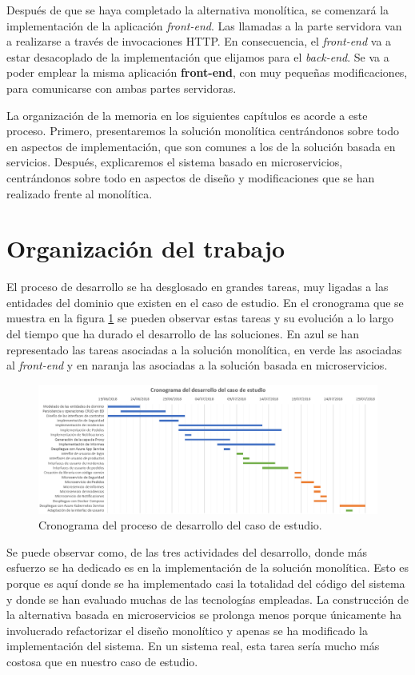 \documentclass[11pt,spanish,listoffigures]{tfgetsinf}
\begin{document}
Después de que se haya completado la alternativa monolítica, se comenzará la implementación de la aplicación \textit{front-end}. Las llamadas a la parte servidora van a realizarse a través de invocaciones HTTP. En consecuencia, el \textit{front-end} va a estar desacoplado de la implementación que elijamos para el \textit{back-end}. Se va a poder emplear la misma aplicación \textbf{front-end}, con muy pequeñas modificaciones, para comunicarse con ambas partes servidoras.

La organización de la memoria en los siguientes capítulos es acorde a este proceso. Primero, presentaremos la solución monolítica centrándonos sobre todo en aspectos de implementación, que son comunes a los de la solución basada en servicios. Después, explicaremos el sistema basado en microservicios, centrándonos sobre todo en aspectos de diseño y modificaciones que se han realizado frente al monolítica.

\section{Organización del trabajo}

El proceso de desarrollo se ha desglosado en grandes tareas, muy ligadas a las entidades del dominio que existen en el caso de estudio. En el cronograma que se muestra en la figura \ref{fig:Cronograma} se pueden observar estas tareas y su evolución a lo largo del tiempo que ha durado el desarrollo de las soluciones. En azul se han representado las tareas asociadas a la solución monolítica, en verde las asociadas al \textit{front-end} y en naranja las asociadas a la solución basada en microservicios.

\begin{figure}[h]
\centering
\includegraphics[scale=0.5]{Cronograma}
\caption{Cronograma del proceso de desarrollo del caso de estudio.}
\label{fig:Cronograma}
\end{figure}

Se puede observar como, de las tres actividades del desarrollo, donde más esfuerzo se ha dedicado es en la implementación de la solución monolítica. Esto es porque es aquí donde se ha implementado casi la totalidad del código del sistema y donde se han evaluado muchas de las tecnologías empleadas. La construcción de la alternativa basada en microservicios se prolonga menos porque únicamente ha involucrado refactorizar el diseño monolítico y apenas se ha modificado la implementación del sistema. En un sistema real, esta tarea sería mucho más costosa que en nuestro caso de estudio.
\end{document}
